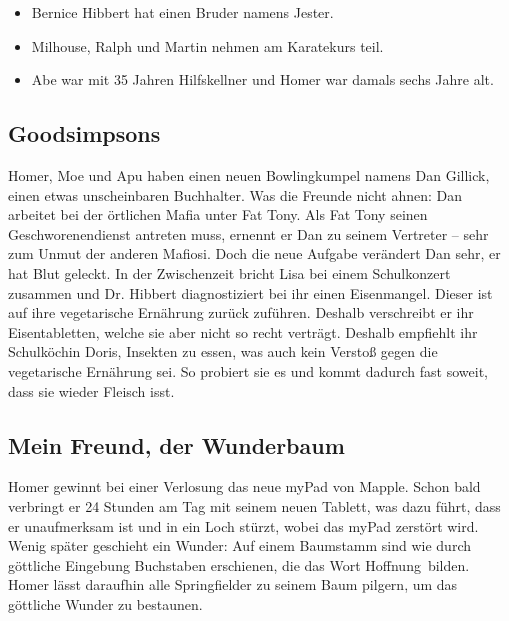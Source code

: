 \begin{itemize}
	\item Bernice Hibbert hat einen Bruder namens Jester.
	\item Milhouse, Ralph und Martin nehmen am Karatekurs teil.
	\item Abe war mit 35 Jahren Hilfskellner und Homer war damals sechs Jahre alt.
\end{itemize}

\subsection{Goodsimpsons}
Homer, Moe und Apu haben einen neuen Bowlingkumpel namens Dan Gillick, einen etwas unscheinbaren Buchhalter. Was die Freunde nicht ahnen: Dan arbeitet bei der örtlichen Mafia unter Fat Tony. Als Fat Tony seinen Geschworenendienst antreten muss, ernennt er Dan zu seinem Vertreter -- sehr zum Unmut der anderen Mafiosi. Doch die neue Aufgabe verändert Dan sehr, er hat Blut geleckt. In der Zwischenzeit bricht Lisa bei einem Schulkonzert zusammen und Dr. Hibbert diagnostiziert bei ihr einen Eisenmangel. Dieser ist auf ihre vegetarische Ernährung zurück zuführen. Deshalb verschreibt er ihr Eisentabletten, welche sie aber nicht so recht verträgt. Deshalb empfiehlt ihr Schulköchin Doris, Insekten zu essen, was auch kein Verstoß gegen die vegetarische Ernährung sei. So probiert sie es und kommt dadurch fast soweit, dass sie wieder Fleisch isst.


\subsection{Mein Freund, der Wunderbaum}\label{PABF22}
Homer gewinnt bei einer Verlosung das neue myPad von Mapple. Schon bald verbringt er 24 Stunden am Tag mit seinem neuen Tablett, was dazu führt, dass er unaufmerksam ist und in ein Loch stürzt, wobei das myPad zerstört wird. Wenig später geschieht ein Wunder: Auf einem Baumstamm sind wie durch göttliche Eingebung Buchstaben erschienen, die das Wort \glqq Hoffnung\grqq\ bilden. Homer lässt daraufhin alle Springfielder zu seinem Baum pilgern, um das göttliche Wunder zu bestaunen.

